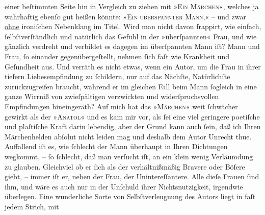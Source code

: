 \begin{ledgroupsized}[t]{13cm}
               einer beſtimmten Seite hin in Vergleich zu ziehen mit »\textsc{Ein Märchen}«, welches ja wahrhaftig ebenſo gut heißen könnte: »\textsc{Ein
                  überspannter Mann},« – und zwar \uline{ohne}
               ironiſchen Nebenklang im Titel. Wird man nicht davon frappirt, wie einfach,
               ſelbſtverſtändlich und natürlich das Gefühl in der »überſpannten« Frau, und wie
               gänzlich verdreht und verbildet es dagegen im überſpannten Mann iſt? Mann und Frau,
               ſo einander gegenübergeſtellt, nehmen ſich faſt wie Krankheit und Geſundheit aus. Und
               verräth es nicht etwas, wenn ein Autor, um die Frau
               in ihrer tiefern Liebesempfindung zu ſchildern, nur auf das Nächſte, Natürlichſte
               zurückzugreifen braucht, während er im gleichen Fall beim Mann ſogleich in {\pb}eine ganze Wirrniß von zwieſpältigen
               verzwickten und widerſpruchsvollen Empfindungen hineingeräth? Auf mich hat das »\textsc{Märchen}« weit ſchwächer gewirkt als der »\textsc{Anatol}« und es kam mir vor, als ſei eine viel geringere poetiſche und plaſtiſche Kraft
               darin lebendig, aber der Grund kann auch ſein, daß ich Ihren Märchenhelden abſolut
               nicht leiden mag und deshalb dem Autor Unrecht thue. Auffallend iſt es, wie ſchlecht
               der Mann überhaupt in Ihren Dichtungen wegkommt, – ſo ſchlecht, daß man verſucht iſt,
               an ein klein wenig Verläumdung zu glauben. Gleichviel ob er ſich als der
               verhältnißmäßig Bravere oder Böſere giebt, – immer iſt er, neben der Frau, der
               Unintereſſantere. Alle dieſe Frauen ſind ihm, und wäre es auch nur in der Unſchuld
               ihrer Nichtsnutzigkeit, irgendwie überlegen. Eine wunderliche Sorte von
               Selbſtverleugnung \introOben{}des Autors\introOben{} liegt in faſt jedem Strich, mit

\end{ledgroupsized}
